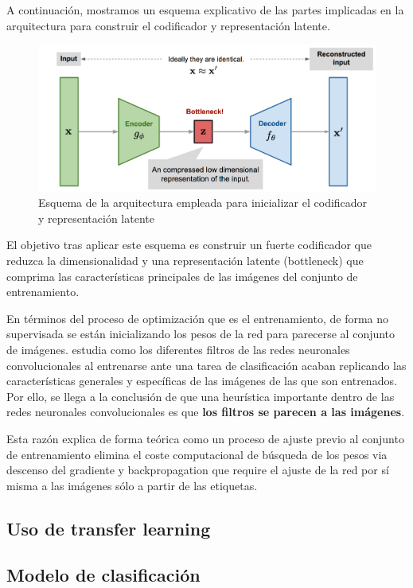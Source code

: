 A continuación, mostramos un esquema explicativo de las partes implicadas en la arquitectura para construir el codificador y representación latente.

\begin{figure}[H]
	\centering
	\includegraphics[width=1.0\linewidth]{imagenes/esquema_codificador.png}
	\caption{Esquema de la arquitectura empleada para inicializar el codificador y representación latente}
\end{figure}


El objetivo tras aplicar este esquema es construir un fuerte codificador que reduzca la dimensionalidad y una representación latente (bottleneck) que comprima las características principales de las imágenes del conjunto de entrenamiento.

En términos del proceso de optimización que es el entrenamiento, de forma no supervisada se están inicializando los pesos de la red para parecerse al conjunto de imágenes. \cite{zeiler2014visualizing} estudia como los diferentes filtros de las redes neuronales convolucionales al entrenarse ante una tarea de clasificación acaban replicando las características generales y específicas de las imágenes de las que son entrenados. Por ello, se llega a la conclusión de que una heurística importante dentro de las redes neuronales convolucionales es que \textbf{los filtros se parecen a las imágenes}. 

Esta razón explica de forma teórica como un proceso de ajuste previo al conjunto de entrenamiento elimina el coste computacional de búsqueda de los pesos via descenso del gradiente y backpropagation que require el ajuste de la red por sí misma a las imágenes sólo a partir de las etiquetas. 

\subsection{Uso de transfer learning}

\subsection{Modelo de clasificación}

